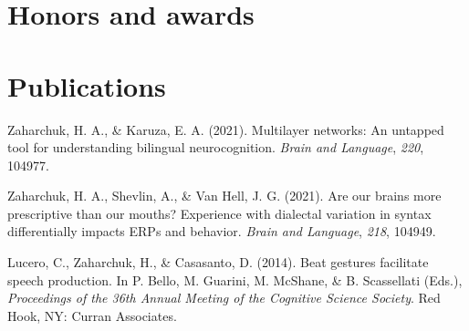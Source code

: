 \documentclass[11pt, a4paper]{awesome-cv}
\begin{document}
\hypertarget{honors-and-awards}{%
\section{Honors and awards}\label{honors-and-awards}}

\begin{cventries}
    \vspace{-4.0mm}
    \vspace{-4.0mm}
    \vspace{-4.0mm}
    \vspace{-4.0mm}
\end{cventries}

\hypertarget{publications}{%
\section{Publications}\label{publications}}

\setlength{\parindent}{-0.2in}
\setlength{\leftskip}{0.2in}

\noindent

\hypertarget{refs_main}{}
\leavevmode\hypertarget{ref-2}{}%
Zaharchuk, H. A., \& Karuza, E. A. (2021). Multilayer networks: An
untapped tool for understanding bilingual neurocognition. \emph{Brain
and Language}, \emph{220}, 104977.

\leavevmode\hypertarget{ref-3}{}%
Zaharchuk, H. A., Shevlin, A., \& Van Hell, J. G. (2021). Are our brains
more prescriptive than our mouths? Experience with dialectal variation
in syntax differentially impacts {ERPs} and behavior. \emph{Brain and
Language}, \emph{218}, 104949.

\leavevmode\hypertarget{ref-1}{}%
Lucero, C., Zaharchuk, H., \& Casasanto, D. (2014). Beat gestures
facilitate speech production. In P. Bello, M. Guarini, M. McShane, \& B.
Scassellati (Eds.), \emph{{Proceedings of the 36th Annual Meeting of the
Cognitive Science Society}}. Red Hook, NY: Curran Associates.
\end{document}
